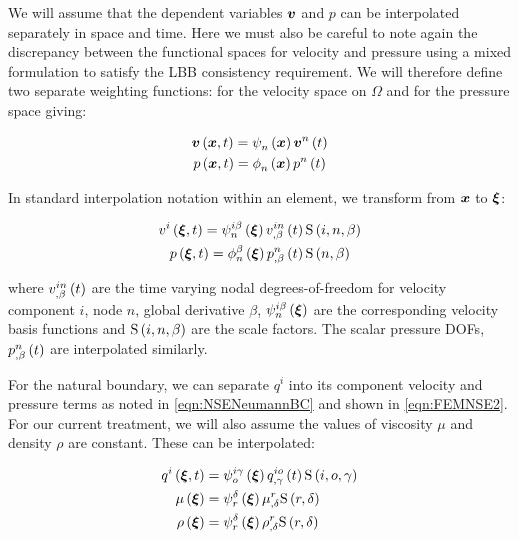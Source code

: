 We will assume that the dependent variables $\vectr{v}$ and $p$ can be
interpolated separately in space and time. Here we must also be careful to
note again the discrepancy between the functional spaces for velocity and
pressure using a mixed formulation to satisfy the LBB consistency
requirement. We will therefore define two separate weighting functions: for
the velocity space on $\Omega$ and for the pressure space giving:

\begin{gather}
  \fnof{\vectr{v}}{\vectr{x},t}=\gbfn{n}{}{\vectr{x}}\fnof{\nodept{\vectr{v}}{n}}{t}\\
  \fnof{p}{\vectr{x},t}=\altgbfn{n}{}{\vectr{x}}\fnof{\nodept{p}{n}}{t}
\end{gather}

In standard interpolation notation within an element, we transform from
$\vectr{x}$ to $\vectr{\xi}$:

\begin{gather}
  \fnof{v^{i}}{\vectr{\xi},t}=\idxgbfn{i}{n}{\beta}{\vectr{\xi}}
  \fnof{\idxnodedof{v}{i}{n}{\beta}}{t}\idxgsf{i}{n}{\beta}\\
  \fnof{p}{\vectr{\xi},t}=\altgbfn{n}{\beta}{\vectr{\xi}}
  \fnof{\nodedof{p}{n}{\beta}}{t}\gsf{n}{\beta}
\end{gather}

where $\fnof{\idxnodedof{v}{i}{n}{\beta}}{t}$ are the time varying nodal
degrees-of-freedom for velocity component $i$, node $n$, global derivative
$\beta$, $\idxgbfn{i}{n}{\beta}{\vectr{\xi}}$ are the corresponding velocity
basis functions and $\idxgsf{i}{n}{\beta}$ are the scale factors. The scalar
pressure DOFs, $\fnof{\nodedof{p}{n}{\beta}}{t}$ are interpolated
similarly.

For the natural boundary, we can separate $q^{i}$ into its component velocity
and pressure terms as noted in \ref{eqn:NSENeumannBC} and shown in
\ref{eqn:FEMNSE2}. For our current treatment, we will also assume the values
of viscosity $\mu$ and density $\rho$ are constant. These can be interpolated:

\begin{equation}
  \begin{split}
    \fnof{q^{i}}{\vectr{\xi},t} &= \idxgbfn{i}{o}{\gamma}{\vectr{\xi}}
      \fnof{\idxnodedof{q}{i}{o}{\gamma}}{t}\idxgsf{i}{o}{\gamma} \\
    \fnof{\mu}{\vectr{\xi}} &=\gbfn{r}{\delta}{\vectr{\xi}}
    \nodedof{\mu}{r}{\delta}\gsf{r}{\delta} \\
    \fnof{\rho}{\vectr{\xi}} &=\gbfn{r}{\delta}{\vectr{\xi}}\nodedof{\rho}{r}{\delta}
    \gsf{r}{\delta} \\
  \end{split}
\end{equation}

